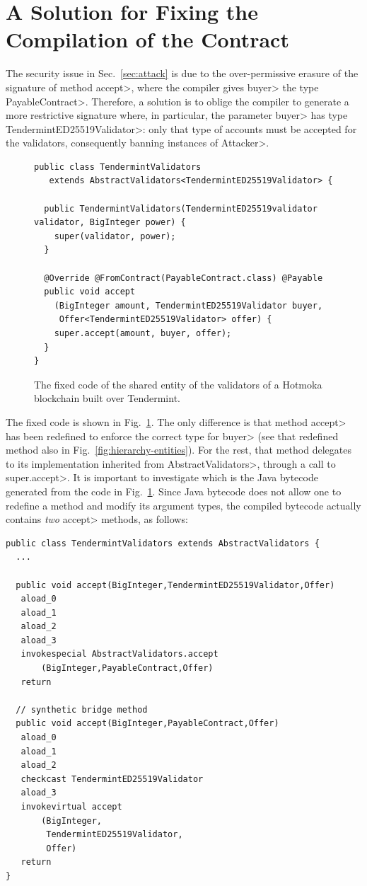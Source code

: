 \section{A Solution for Fixing the Compilation of the Contract}\label{sec:fix}

The security issue in Sec.~\ref{sec:attack} is due to the
over-permissive erasure of the signature of method \<accept>,
where the compiler gives \<buyer> the type \<PayableContract>.
Therefore, a solution is to oblige the compiler to generate a more
restrictive signature where, in particular, the parameter \<buyer>
has type \<TendermintED25519Validator>: only that type of accounts
must be accepted for the validators, consequently banning instances of \<Attacker>.

\begin{figure}[ht]
  \begin{center}
    \begin{lstlisting}[language=Takamaka]
public class TendermintValidators
   extends AbstractValidators<TendermintED25519Validator> {

  public TendermintValidators(TendermintED25519validator validator, BigInteger power) {
    super(validator, power);
  }

  @Override @FromContract(PayableContract.class) @Payable
  public void accept
    (BigInteger amount, TendermintED25519Validator buyer, 
     Offer<TendermintED25519Validator> offer) {
    super.accept(amount, buyer, offer);
  }
}
    \end{lstlisting}
  \end{center}
  \caption{The fixed code of the shared entity of the validators of a Hotmoka blockchain built over Tendermint.}\label{fig:solution}
\end{figure}

The fixed code is shown in Fig.~\ref{fig:solution}. The only difference is that method
\<accept> has been redefined to enforce the correct type for \<buyer>
(see that redefined method also in Fig.~\ref{fig:hierarchy-entities}). For the rest, that method
delegates to its implementation inherited from \<AbstractValidators>, through a call
to \<super.accept>.
It is important to investigate which is the Java bytecode generated from
the code in Fig.~\ref{fig:solution}. Since Java bytecode does not allow one to redefine a method
and modify its argument types, the compiled bytecode actually contains \emph{two}
\<accept> methods, as follows:

\begin{lstlisting}[language=JavaBytecode]
public class TendermintValidators extends AbstractValidators {
  ...
  
  public void accept(BigInteger,TendermintED25519Validator,Offer)
   aload_0
   aload_1
   aload_2
   aload_3
   invokespecial AbstractValidators.accept
       (BigInteger,PayableContract,Offer)
   return

  // synthetic bridge method
  public void accept(BigInteger,PayableContract,Offer)
   aload_0
   aload_1
   aload_2
   checkcast TendermintED25519Validator
   aload_3
   invokevirtual accept
       (BigInteger,
        TendermintED25519Validator,
        Offer)
   return
}
\end{lstlisting}

